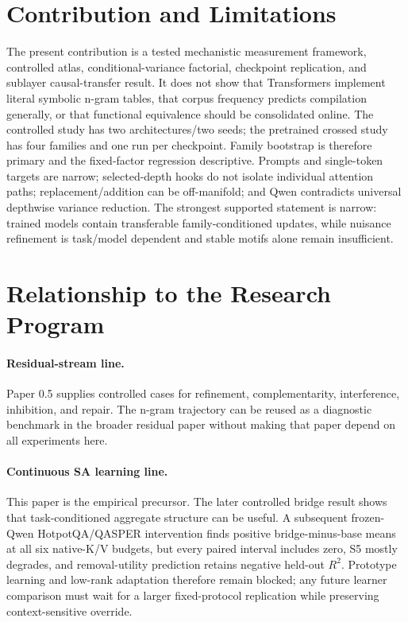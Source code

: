 \documentclass[10pt]{article}
\begin{document}
\section{Contribution and Limitations}
The present contribution is a tested mechanistic measurement framework, controlled atlas, conditional-variance factorial, checkpoint replication, and sublayer causal-transfer result. It does not show that Transformers implement literal symbolic n-gram tables, that corpus frequency predicts compilation generally, or that functional equivalence should be consolidated online. The controlled study has two architectures/two seeds; the pretrained crossed study has four families and one run per checkpoint. Family bootstrap is therefore primary and the fixed-factor regression descriptive. Prompts and single-token targets are narrow; selected-depth hooks do not isolate individual attention paths; replacement/addition can be off-manifold; and Qwen contradicts universal depthwise variance reduction. The strongest supported statement is narrow: trained models contain transferable family-conditioned updates, while nuisance refinement is task/model dependent and stable motifs alone remain insufficient.

\section{Relationship to the Research Program}
\paragraph{Residual-stream line.}
Paper 0.5 supplies controlled cases for refinement, complementarity, interference, inhibition, and repair. The n-gram trajectory can be reused as a diagnostic benchmark in the broader residual paper without making that paper depend on all experiments here.

\paragraph{Continuous SA learning line.}
This paper is the empirical precursor. The later controlled bridge result shows that task-conditioned aggregate structure can be useful. A subsequent frozen-Qwen HotpotQA/QASPER intervention finds positive bridge-minus-base means at all six native-K/V budgets, but every paired interval includes zero, S5 mostly degrades, and removal-utility prediction retains negative held-out $R^2$. Prototype learning and low-rank adaptation therefore remain blocked; any future learner comparison must wait for a larger fixed-protocol replication while preserving context-sensitive override.
\end{document}
